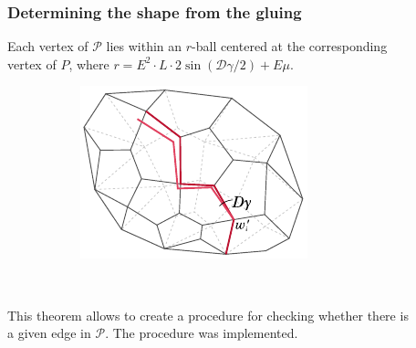 \renewcommand{\thefootnote}{*}

\def\P{\mathcal P}
\def\ball#1{B_r ( #1 )}

\begin{frame}
\frametitle{Determining the shape from the gluing}

\begin{theorem}
	Each vertex of $\P$ lies within an $r$-ball centered at the corresponding \\
	vertex of $P$, where
	$r = E^2 \cdot  L \cdot 2 \sin ( \mathcal D \gamma / 2 ) + E \mu$.
\end{theorem} \vspace{-1.2mm}

\begin{figure}
	\centering
	\begin{subfigure}[m]{0.37\columnwidth}
		\centering
		\includegraphics[scale=0.92]{figs_pres/anglePathOffset}
	\end{subfigure}
~
	\begin{subfigure}[m]{0.47\columnwidth}
		\centering
		\def\scopescale{0.45}
		\makecell[c]{}
	\end{subfigure}
\end{figure} \vspace{-2.2mm}

This theorem allows to create a procedure for checking whether there is \\
a given edge in $\P$. The procedure was implemented.

\end{frame}